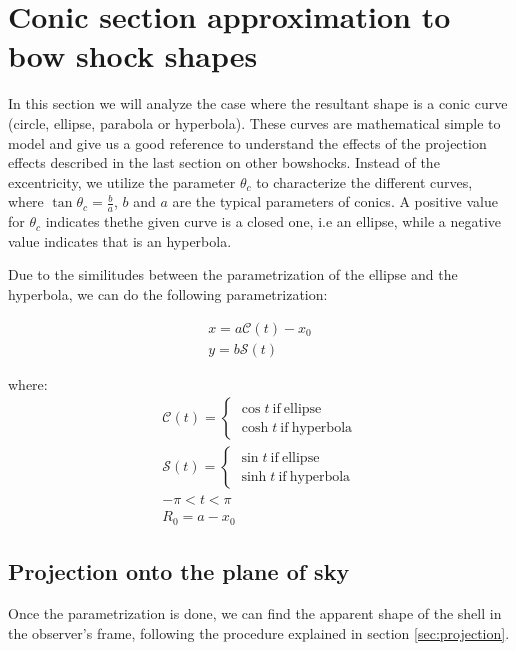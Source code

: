 \section{Conic section approximation to bow shock shapes}
\label{sec:conic}

\newcommand\Sin{\ensuremath{\mathcal{S}}}
\newcommand\Cos{\ensuremath{\mathcal{C}}}
\newcommand\Cot{\ensuremath{\mathcal{T}}}

In this section we will analyze the case where the resultant shape is a conic curve (circle, ellipse, parabola or hyperbola).
These curves are mathematical simple to model and give us a good reference to understand the effects of the projection effects
described in the last section on other bowshocks. Instead of the excentricity, we utilize the parameter $\theta_c$ to characterize the different curves, where
$\tan\theta_c = \frac{b}{a}$,  $b$ and $a$ are the typical parameters of conics. A positive value for $\theta_c$ indicates thethe given curve is a closed one, i.e
an ellipse, while a negative value indicates that is an hyperbola. %

Due to the similitudes between the parametrization of the ellipse and the hyperbola, we can do the following parametrization:

\begin{align}
x = a\Cos(t)-x_0 \\ 
y = b\Sin(t)
\end{align}

where:
\begin{align}
\Cos(t) = \left\lbrace \begin{array}{c}
\cos t ~\mathrm{if~ellipse} \\
\cosh t ~\mathrm{if~hyperbola}
\end{array}\right.\\
\Sin(t) = \left\lbrace \begin{array}{c}
\sin t ~\mathrm{if~ellipse} \\
\sinh t ~\mathrm{if~hyperbola}
\end{array}\right. \\
-\pi < t < \pi \\
R_0 = a - x_0 
\end{align}

\subsection{Projection onto the plane of sky} 

Once the parametrization is done, we can find the apparent shape of the shell in the observer's frame, following the procedure explained in section \ref{sec:projection}.


